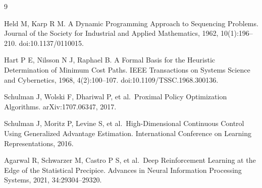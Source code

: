 \begin{thebibliography}{9}
\small\setlength{\itemsep}{8pt}

 Held M, Karp R M. A Dynamic Programming Approach to Sequencing Problems. Journal of the Society for Industrial and Applied Mathematics, 1962, 10(1):196--210. doi:10.1137/0110015.

 Hart P E, Nilsson N J, Raphael B. A Formal Basis for the Heuristic Determination of Minimum Cost Paths. IEEE Transactions on Systems Science and Cybernetics, 1968, 4(2):100--107. doi:10.1109/TSSC.1968.300136.

 Schulman J, Wolski F, Dhariwal P, et al.~Proximal Policy Optimization Algorithms. arXiv:1707.06347, 2017.

 Schulman J, Moritz P, Levine S, et al.~High-Dimensional Continuous Control Using Generalized Advantage Estimation. International Conference on Learning Representations, 2016.

 Agarwal R, Schwarzer M, Castro P S, et al.~Deep Reinforcement Learning at the Edge of the Statistical Precipice. Advances in Neural Information Processing Systems, 2021, 34:29304--29320.

\end{thebibliography}
